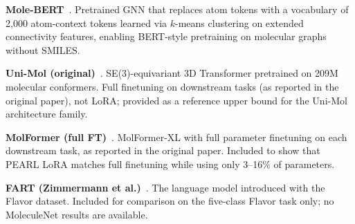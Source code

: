 \documentclass[9pt,a4paper]{article}
\begin{document}
\noindent\textbf{Mole-BERT}~\cite{xia2023molecbert}.
Pretrained GNN that replaces atom tokens with a vocabulary of 2{,}000 atom-context
tokens learned via $k$-means clustering on extended connectivity features,
enabling BERT-style pretraining on molecular graphs without SMILES.

\noindent\textbf{Uni-Mol (original)}~\cite{zhou2023unimol}.
SE(3)-equivariant 3D Transformer pretrained on 209M molecular conformers.
Full finetuning on downstream tasks (as reported in the original paper),
not LoRA; provided as a reference upper bound for the Uni-Mol architecture family.

\noindent\textbf{MolFormer (full FT)}~\cite{ross2022molformer}.
MolFormer-XL with full parameter finetuning on each downstream task, as reported in the
original paper. Included to show that PEARL LoRA matches full finetuning while using
only 3--16\% of parameters.

\noindent\textbf{FART (Zimmermann et al.)}~\cite{zimmermann2024fart}.
The language model introduced with the Flavor dataset. Included for comparison
on the five-class Flavor task only; no MoleculeNet results are available.
\end{document}
